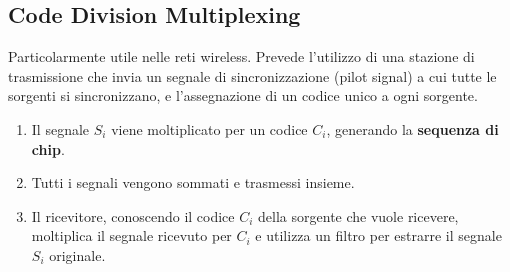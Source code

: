 \subsection{Code Division Multiplexing}
Particolarmente utile nelle reti wireless. 
Prevede l'utilizzo di una stazione di trasmissione che invia un segnale di sincronizzazione (pilot signal) a cui tutte le sorgenti si sincronizzano, e l'assegnazione di un codice unico a ogni sorgente.
\begin{enumerate}
	\item Il segnale $S_i$ viene moltiplicato per un codice $C_i$, generando la \textbf{sequenza di chip}.
	\item Tutti i segnali vengono sommati e trasmessi insieme.
	\item Il ricevitore, conoscendo il codice $C_i$ della sorgente che vuole ricevere, moltiplica il segnale ricevuto per $C_i$ e utilizza un filtro per estrarre il segnale $S_i$ originale.
\end{enumerate}

